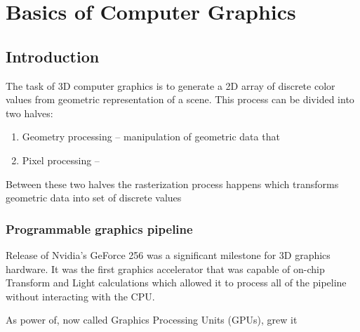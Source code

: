 \chapter{Basics of Computer Graphics}


\section*{Introduction}

The task of 3D computer graphics is to generate a 2D array of discrete color values from geometric representation of a scene. This process can be divided into two halves:
\begin{enumerate}
  \item Geometry processing -- manipulation of geometric data that
  \item Pixel processing -- 
\end{enumerate}

Between these two halves the rasterization process happens which transforms geometric data into set of discrete values 

\subsection{Programmable graphics pipeline}

Release of Nvidia's GeForce 256 was a significant milestone for 3D graphics hardware. It was the first graphics accelerator that was capable of on-chip Transform and Light calculations which allowed it to process all of the pipeline without interacting with the CPU.

As power of, now called Graphics Processing Units (GPUs), grew it 
